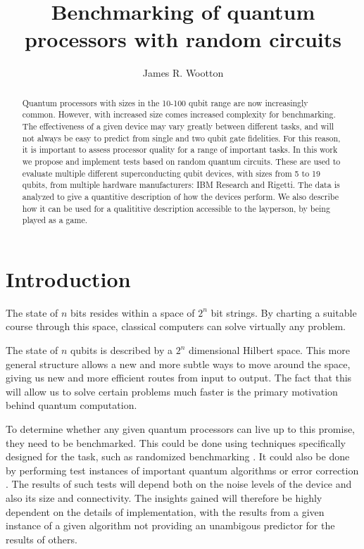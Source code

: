 \documentclass[aps,prl,twocolumn,showpacs,preprintnumbers]{revtex4-1}
\begin{document}
\title{Benchmarking of quantum processors with random circuits}
\author{James R. Wootton}


\begin{abstract}

Quantum processors with sizes in the 10-100 qubit range are now increasingly common. However, with increased size comes increased complexity for benchmarking. The effectiveness of a given device may vary greatly between different tasks, and will not always be  easy to predict from single and two qubit gate fidelities. For this reason, it is important to assess processor quality for a range of important tasks. In this work we propose and implement tests based on random quantum circuits. These are used to evaluate multiple different superconducting qubit devices, with sizes from 5 to 19 qubits, from multiple hardware manufacturers: IBM Research and Rigetti. The data is analyzed to give a quantitive description of how the devices perform.  We also describe how it can be used for a qualititive description accessible to the layperson, by being played as a game.


\end{abstract}



\maketitle


\section{Introduction}

The state of $n$ bits resides within a space of $2^n$ bit strings. By charting a suitable course through this space, classical computers can solve virtually any problem.

The state of $n$ qubits is described by a $2^n$ dimensional Hilbert space. This more general structure allows a new and more subtle ways to move around the space, giving us new and more efficient routes from input to output. The fact that this will allow us to solve certain problems much faster is the primary motivation behind quantum computation.

To determine whether any given quantum processors can live up to this promise, they need to be benchmarked. This could be done using techniques specifically designed for the task, such as randomized benchmarking \cite{}. It could also be done by performing test instances of important quantum algorithms \cite{} or error correction \cite{}. The results of such tests will depend both on the noise levels of the device and also its size and connectivity. The insights gained will therefore be highly dependent on the details of implementation, with the results from a given instance of a given algorithm not providing an unambigous predictor for the results of others.
\end{document}
